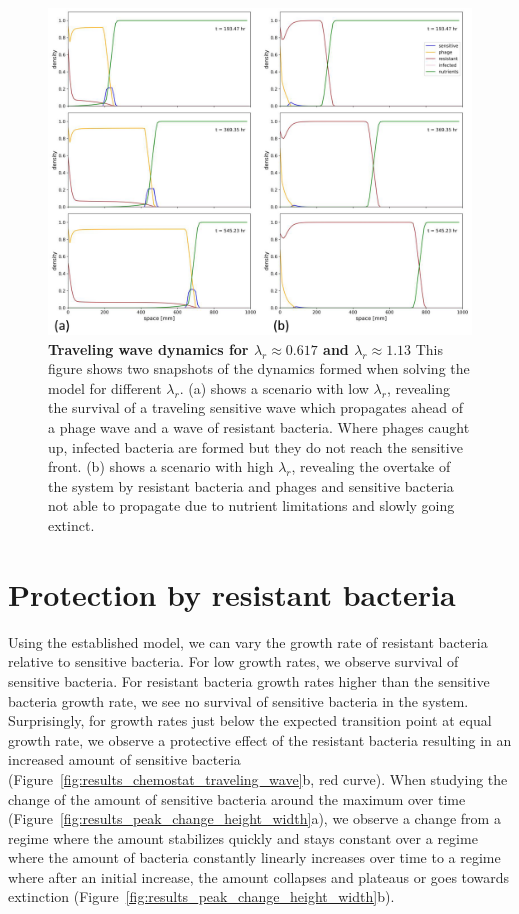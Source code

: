 \begin{figure}
\centering
\includegraphics[width=\linewidth]{graphics/2025_09_30_phages_fig4.png}
\caption{\textbf{Traveling wave dynamics for $\lambda_r \approx 0.617$ and $\lambda_r \approx 1.13$} This figure shows two snapshots of the dynamics formed when solving the model for different $\lambda_r$. (a) shows a scenario with low $\lambda_r$, revealing the survival of a traveling sensitive wave which propagates ahead of a phage wave and a wave of resistant bacteria. Where phages caught up, infected bacteria are formed but they do not reach the sensitive front. (b) shows a scenario with high $\lambda_r$, revealing the overtake of the system by resistant bacteria and phages and sensitive bacteria not able to propagate due to nutrient limitations and slowly going extinct.}
\label{fig:traveling_wave_dynamics}
\end{figure}

\section{Protection by resistant bacteria}
\label{sec:protective_effect}
Using the established model, we can vary the growth rate of resistant bacteria relative to sensitive bacteria. For low growth rates, we observe survival of sensitive bacteria. For resistant bacteria growth rates higher than the sensitive bacteria growth rate, we see no survival of sensitive bacteria in the system. Surprisingly, for growth rates just below the expected transition point at equal growth rate, we observe a protective effect of the resistant bacteria resulting in an increased amount of sensitive bacteria (Figure~\ref{fig:results_chemostat_traveling_wave}b, red curve). When studying the change of the amount of sensitive bacteria around the maximum over time (Figure~\ref{fig:results_peak_change_height_width}a), we observe a change from a regime where the amount stabilizes quickly and stays constant over a regime where the amount of bacteria constantly linearly increases over time to a regime where after an initial increase, the amount collapses and plateaus or goes towards extinction (Figure~\ref{fig:results_peak_change_height_width}b).

